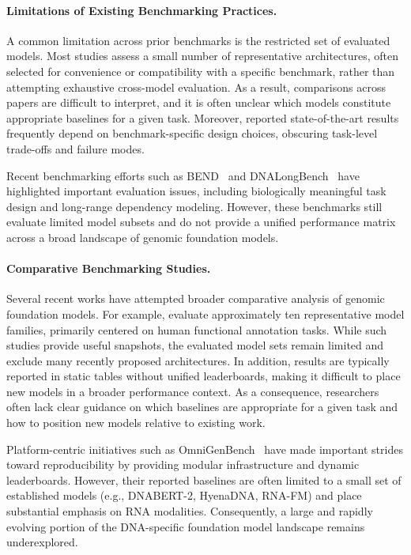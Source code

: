 \documentclass{article}
\theoremstyle{plain}
\theoremstyle{definition}
\theoremstyle{remark}
\begin{document}
\paragraph{Limitations of Existing Benchmarking Practices.}
A common limitation across prior benchmarks is the restricted set of evaluated models. Most studies assess a small number of representative architectures, often selected for convenience or compatibility with a specific benchmark, rather than attempting exhaustive cross-model evaluation. As a result, comparisons across papers are difficult to interpret, and it is often unclear which models constitute appropriate baselines for a given task. Moreover, reported state-of-the-art results frequently depend on benchmark-specific design choices, obscuring task-level trade-offs and failure modes.

Recent benchmarking efforts such as BEND~\citep{marin2024bendbenchmarkingdnalanguage} and DNALongBench~\citep{Cheng2025.01.06.631595} have highlighted important evaluation issues, including biologically meaningful task design and long-range dependency modeling. However, these benchmarks still evaluate limited model subsets and do not provide a unified performance matrix across a broad landscape of genomic foundation models.

\paragraph{Comparative Benchmarking Studies.}
Several recent works have attempted broader comparative analysis of genomic foundation models. For example, \citet{wang2025genomic} evaluate approximately ten representative model families, primarily centered on human functional annotation tasks. While such studies provide useful snapshots, the evaluated model sets remain limited and exclude many recently proposed architectures. In addition, results are typically reported in static tables without unified leaderboards, making it difficult to place new models in a broader performance context. As a consequence, researchers often lack clear guidance on which baselines are appropriate for a given task and how to position new models relative to existing work.

Platform-centric initiatives such as OmniGenBench~\citep{wang2025omnigenbenchbenchmarkomnipotentmultimodal} have made important strides toward reproducibility by providing modular infrastructure and dynamic leaderboards. However, their reported baselines are often limited to a small set of established models (e.g., DNABERT-2, HyenaDNA, RNA-FM) and place substantial emphasis on RNA modalities. Consequently, a large and rapidly evolving portion of the DNA-specific foundation model landscape remains underexplored.
\end{document}
